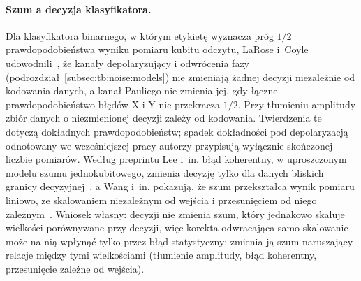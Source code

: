 \paragraph{Szum a decyzja klasyfikatora.}
Dla klasyfikatora binarnego, w którym etykietę wyznacza próg $1/2$ prawdopodobieństwa wyniku pomiaru kubitu odczytu, LaRose i~Coyle udowodnili~\cite{larose_robust_2020}, że kanały depolaryzujący i odwrócenia fazy (podrozdział~\ref{subsec:tb:noise:models}) nie zmieniają żadnej decyzji niezależnie od kodowania danych, a kanał Pauliego nie zmienia jej, gdy łączne prawdopodobieństwo błędów $\mathrm{X}$ i $\mathrm{Y}$ nie przekracza $1/2$.
Przy tłumieniu amplitudy zbiór danych o niezmienionej decyzji zależy od kodowania.
Twierdzenia te dotyczą dokładnych prawdopodobieństw; spadek dokładności pod depolaryzacją odnotowany we wcześniejszej pracy autorzy przypisują wyłącznie skończonej liczbie pomiarów.
Według preprintu Lee i~in. błąd koherentny, w uproszczonym modelu szumu jednokubitowego, zmienia decyzję tylko dla danych bliskich granicy decyzyjnej~\cite{lee_some_2022}, a Wang i~in. pokazują, że szum przekształca wynik pomiaru liniowo, ze skalowaniem niezależnym od wejścia i przesunięciem od niego zależnym~\cite{wang_quantumnat_2022}.
Wniosek własny: decyzji nie zmienia szum, który jednakowo skaluje wielkości porównywane przy decyzji, więc korekta odwracająca samo skalowanie może na nią wpłynąć tylko przez błąd statystyczny; zmienia ją szum naruszający relacje między tymi wielkościami (tłumienie amplitudy, błąd koherentny, przesunięcie zależne od wejścia).


